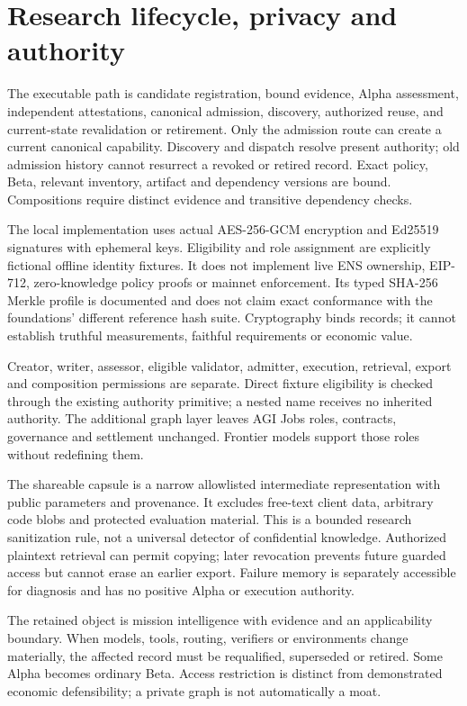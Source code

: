 \documentclass[11pt,letterpaper]{article}
\newcommand{\code}[1]{\texttt{\detokenize{#1}}}
\begin{document}
\section{Research lifecycle, privacy and authority}

The executable path is candidate registration, bound evidence, Alpha assessment, independent attestations, canonical admission, discovery, authorized reuse, and current-state revalidation or retirement. Only the admission route can create a current canonical capability. Discovery and dispatch resolve present authority; old admission history cannot resurrect a revoked or retired record. Exact policy, Beta, relevant inventory, artifact and dependency versions are bound. Compositions require distinct evidence and transitive dependency checks.

The local implementation uses actual AES-256-GCM encryption and Ed25519 signatures with ephemeral keys. Eligibility and role assignment are explicitly fictional offline identity fixtures. It does not implement live ENS ownership, EIP-712, zero-knowledge policy proofs or mainnet enforcement. Its typed SHA-256 Merkle profile is documented and does not claim exact conformance with the foundations' different reference hash suite. Cryptography binds records; it cannot establish truthful measurements, faithful requirements or economic value.

Creator, writer, assessor, eligible validator, admitter, execution, retrieval, export and composition permissions are separate. Direct \code{label.agent.agi.eth} fixture eligibility is checked through the existing authority primitive; a nested name receives no inherited authority. The additional graph layer leaves AGI Jobs \code{*.club.agi.eth} roles, contracts, governance and settlement unchanged. Frontier models support those roles without redefining them.

The shareable capsule is a narrow allowlisted intermediate representation with public parameters and provenance. It excludes free-text client data, arbitrary code blobs and protected evaluation material. This is a bounded research sanitization rule, not a universal detector of confidential knowledge. Authorized plaintext retrieval can permit copying; later revocation prevents future guarded access but cannot erase an earlier export. Failure memory is separately accessible for diagnosis and has no positive Alpha or execution authority.

The retained object is mission intelligence with evidence and an applicability boundary. When models, tools, routing, verifiers or environments change materially, the affected record must be requalified, superseded or retired. Some Alpha becomes ordinary Beta. Access restriction is distinct from demonstrated economic defensibility; a private graph is not automatically a moat.
\end{document}
